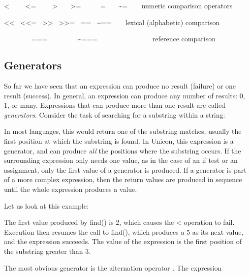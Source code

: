 \textsf{
{\textless} \ \ \ \ {\textless}= \ \ \ \ {\textgreater}
\ \ \ {\textgreater}= \ \ \ \ \ =
\ \ \ \~{}=}\texttt{\ \ }\ \ numeric
comparison operators

\textsf{{\textless}{\textless} \ {\textless}{\textless}=
\ {\textgreater}{\textgreater} \ {\textgreater}{\textgreater}= \ ==
\ \~{}==\ \ }\ \ lexical (alphabetic)
comparison

\ \ \ \ \ \ \ \ \textsf{=== \ \ \ \ \ \ \ \ \~{}===}\ \ \ \ \ \ \ \ \ \ \ \ \ \ \ \ reference comparison

\subsection[Generators]{Generators}

So far we have seen that an expression can produce no result (failure)
or one result (success). In general, an expression can produce any
number of results: 0, 1, or many. Expressions that can produce more
than one result are called \textit{generators}.
Consider the task of searching for a substring within a string:


In most languages, this would return one of the substring matches,
usually the first position at which the substring is found. In Unicon,
this expression is a generator, and can produce \textit{all} the
positions where the substring occurs. If the surrounding expression
only needs one value, as in the case of an if test or an assignment,
only the first value of a generator is produced. If a generator is part
of a more complex expression, then the return values are produced in
sequence until the whole expression produces a value.

Let us look at this example:


The first value produced by \textsf{find()} is 2, which
causes the \textsf{{\textless}}\textsf{ }operation to fail. Execution
then resumes the call to \textsf{find()}, which produces a 5 as its
next value, and the expression succeeds. The value of the expression is
the first position of the substring greater than 3.

The most obvious generator is the alternation operator \textsf{{\textbar}}. The expression

